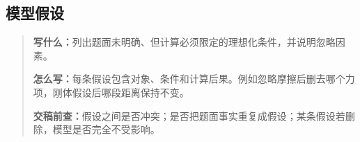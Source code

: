 \subsection{模型假设}
\begin{quote}\small
\noindent\textbf{\color{inkblue}写什么：}列出题面未明确、但计算必须限定的理想化条件，并说明忽略因素。\par
\noindent\textbf{\color{inkblue}怎么写：}每条假设包含对象、条件和计算后果。例如忽略摩擦后删去哪个力项，刚体假设后哪段距离保持不变。\par
\noindent\textbf{\color{inkblue}交稿前查：}假设之间是否冲突；是否把题面事实重复成假设；某条假设若删除，模型是否完全不受影响。
\end{quote}

